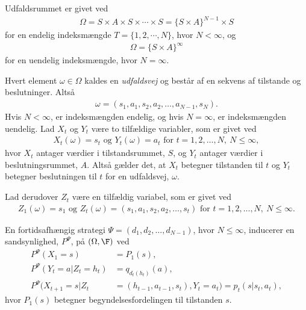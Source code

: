 Udfaldsrummet er givet ved
\begin{align*}
    \Omega = S \times A \times S \times \cdots \times S = \{S \times A\}^{N-1} \times S
\end{align*}
for en endelig indeksmængde $T=\{1, 2,\cdots, N\}$, hvor $N<\infty$, og
\begin{align*}
    \Omega = \{S \times A\}^\infty
\end{align*}
for en uendelig indeksmængde, hvor $N=\infty$.

Hvert element $\omega \in \Omega$ kaldes en \textit{udfaldsvej} og består af en sekvens af tilstande og beslutninger. Altså
\begin{align*}
    \omega=(s_1 , a_1 , s_2 , a_2 , \dots , a_{N-1} , s_N).
\end{align*}
Hvis $N<\infty$, er indeksmængden endelig, og hvis $N=\infty$, er indeksmængden uendelig. 
Lad $X_t$ og $Y_t$ være to tilfældige variabler, som er givet ved
\begin{align*}
    X_t(\omega) = s_t \text{ og } Y_t(\omega) = a_t \text{ for } t=1,2,\dots, N, \  N\leq \infty,
\end{align*}
hvor $X_t$ antager værdier i tilstandsrummet, $S$, og $Y_t$ antager værdier i beslutningsrummet, $A$. Altså gælder det, at $X_t$ betegner tilstanden til $t$ og $Y_t$ betegner beslutningen til $t$ for en udfaldsvej, $\omega$.

Lad derudover $Z_t$ være en tilfældig variabel, som er givet ved
\begin{align*}
    Z_1(\omega) = s_1 \text{ og } Z_t(\omega) = (s_1 , a_1 , s_2 , a_2 , \dots , s_t) \text{ for } t=1,2, \dots, N, \  N\leq \infty.
\end{align*}

En fortidsafhængig strategi $\Psi = (d_1, d_2, \dots, d_{N-1})$, hvor $N \leq \infty$, inducerer en sandsynlighed, $P^\Psi$, på $(\Omega, \F)$ ved
\begin{align}
    P^{\Psi}(X_1=s)&=P_1(s)\label{eqs:de_tre_ligninger},\\
    P^{\Psi}\left(Y_t=a|Z_t=h_t\right)&= q_{d_t(h_t)}(a)\label{eqs:de_tre_ligninger2},\\
    P^{\Psi}\big(X_{t+1}=s|Z_t&=(h_{t-1}, a_{t-1}, s_t), Y_t=a_t \big)=p_t(s|s_t, a_t), \label{eqs:de_tre_ligninger3}
\end{align}
hvor $P_1(s)$ betegner begyndelsesfordelingen til tilstanden $s$.

